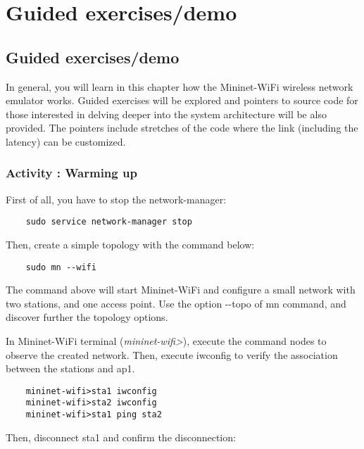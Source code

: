 \chapter{Guided exercises/demo}

\section{Guided exercises/demo}
In general, you will learn in this chapter how the Mininet-WiFi wireless network emulator works. Guided exercises will be explored and pointers to source code for those interested in delving deeper into the system architecture will be also provided. The pointers include stretches of the code where the link (including the latency) can be customized.


\subsection{Activity \themycounter{}: Warming up}   

\noindent First of all, you have to stop the network-manager:

\begin{verbatim}
    sudo service network-manager stop 
\end{verbatim}


\noindent Then, create a simple topology with the command below:

\begin{verbatim}
    sudo mn --wifi
\end{verbatim}
	

\noindent The command above will start Mininet-WiFi and configure a small network with two stations, and one access point. Use the option {-}{-}topo of mn command, and discover further the topology options.

\noindent In Mininet-WiFi terminal (\textit{mininet-wifi>}), execute the command nodes to observe the created network. Then, execute iwconfig to verify the association between the stations and ap1.

\begin{verbatim}
    mininet-wifi>sta1 iwconfig
    mininet-wifi>sta2 iwconfig
    mininet-wifi>sta1 ping sta2
\end{verbatim}

	

\noindent Then, disconnect sta1 and confirm the disconnection:

